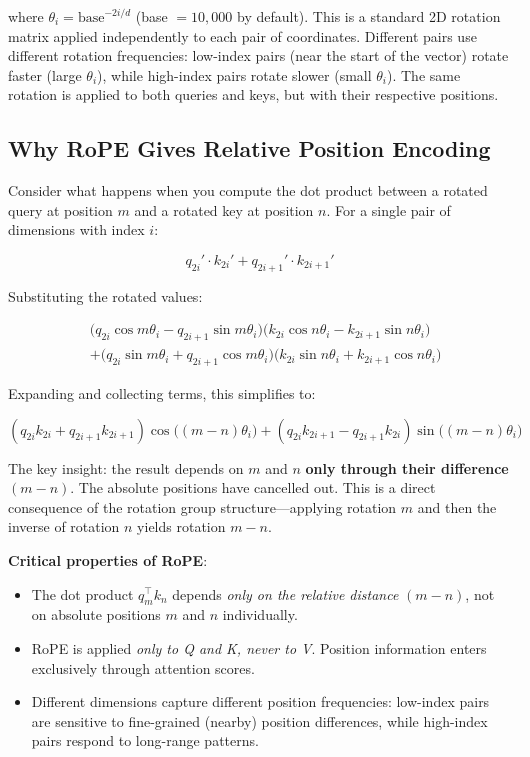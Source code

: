 where $\theta_i = \text{base}^{-2i/d}$ (base $= 10{,}000$ by default). This
is a standard 2D rotation matrix applied independently to each pair of
coordinates. Different pairs use different rotation frequencies: low-index
pairs (near the start of the vector) rotate faster (large $\theta_i$), while
high-index pairs rotate slower (small $\theta_i$). The same rotation is
applied to both queries and keys, but with their respective positions.

\subsection{Why RoPE Gives Relative Position Encoding}

Consider what happens when you compute the dot product between a rotated
query at position $m$ and a rotated key at position $n$. For a single pair
of dimensions with index $i$:

\[
  q_{2i}' \cdot k_{2i}' + q_{2i+1}' \cdot k_{2i+1}'
\]

Substituting the rotated values:

\begin{align*}
  & \bigl(q_{2i}\cos m\theta_i - q_{2i+1}\sin m\theta_i\bigr)
    \bigl(k_{2i}\cos n\theta_i - k_{2i+1}\sin n\theta_i\bigr) \\
  & + \bigl(q_{2i}\sin m\theta_i + q_{2i+1}\cos m\theta_i\bigr)
    \bigl(k_{2i}\sin n\theta_i + k_{2i+1}\cos n\theta_i\bigr)
\end{align*}

Expanding and collecting terms, this simplifies to:

\[
  (q_{2i}k_{2i} + q_{2i+1}k_{2i+1})\cos\bigl((m-n)\theta_i\bigr)
  + (q_{2i}k_{2i+1} - q_{2i+1}k_{2i})\sin\bigl((m-n)\theta_i\bigr)
\]

The key insight: the result depends on $m$ and $n$ \textbf{only through their
difference} $(m - n)$. The absolute positions have cancelled out. This is a
direct consequence of the rotation group structure---applying rotation $m$ and
then the inverse of rotation $n$ yields rotation $m - n$.

\begin{keyconcept}
  \textbf{Critical properties of RoPE}:
  \begin{itemize}
    \item The dot product $q_m^\top k_n$ depends \emph{only on the relative
          distance} $(m - n)$, not on absolute positions $m$ and $n$
          individually.
    \item RoPE is applied \emph{only to Q and K, never to V}. Position
          information enters exclusively through attention scores.
    \item Different dimensions capture different position frequencies:
          low-index pairs are sensitive to fine-grained (nearby) position
          differences, while high-index pairs respond to long-range patterns.
  \end{itemize}
\end{keyconcept}

